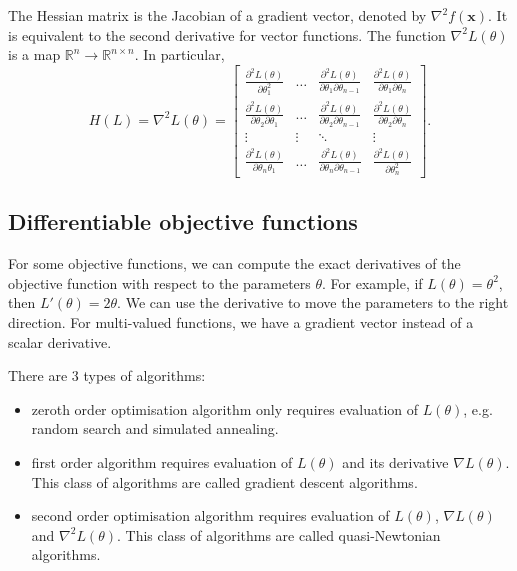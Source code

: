 \documentclass[a4paper, openany]{memoir}
\begin{document}
The Hessian matrix is the Jacobian of a gradient vector, denoted by $\nabla^2 f(\mathbf{x})$. It is equivalent to the second derivative for vector functions. The function $\nabla^2 L(\theta)$ is a map $\mathbb{R}^n \to \mathbb{R}^{n \times n}$. In particular,
\[H(L) = \nabla^2 L(\theta) = \begin{bmatrix}
    \frac{\partial^2 L(\theta)}{\partial \theta_1^2} & \dots & \frac{\partial^2 L(\theta)}{\partial \theta_1 \partial \theta_{n-1}} & \frac{\partial^2 L(\theta)}{\partial \theta_1 \partial \theta_n} \\
    \frac{\partial^2 L(\theta)}{\partial \theta_2 \partial \theta_1} & \dots & \frac{\partial^2 L(\theta)}{\partial \theta_2 \partial \theta_{n-1}} & \frac{\partial^2 L(\theta)}{\partial \theta_2 \partial \theta_n} \\
    \vdots & \vdots & \ddots & \vdots \\
    \frac{\partial^2 L(\theta)}{\partial \theta_n \theta_1} & \dots & \frac{\partial^2 L(\theta)}{\partial \theta_n \partial \theta_{n-1}} & \frac{\partial^2 L(\theta)}{\partial \theta_n^2}
\end{bmatrix}.\]

\subsection{Differentiable objective functions}
For some objective functions, we can compute the exact derivatives of the objective function with respect to the parameters $\theta$. For example, if $L(\theta) = \theta^2$, then $L'(\theta) = 2\theta$. We can use the derivative to move the parameters to the right direction. For multi-valued functions, we have a gradient vector instead of a scalar derivative.

There are 3 types of algorithms:
\begin{itemize}
    \item zeroth order optimisation algorithm only requires evaluation of $L(\theta)$, e.g. random search and simulated annealing.
    \item first order algorithm requires evaluation of $L(\theta)$ and its derivative $\nabla L(\theta)$. This class of algorithms are called gradient descent algorithms.
    \item second order optimisation algorithm requires evaluation of $L(\theta)$, $\nabla L(\theta)$ and $\nabla^2 L(\theta)$. This class of algorithms are called quasi-Newtonian algorithms.
\end{itemize}
\end{document}
